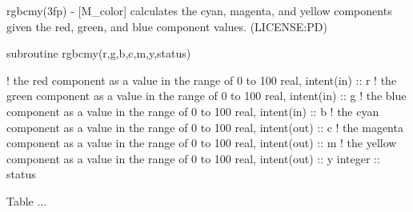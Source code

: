 \begin{DoxyDescription}
\item[\label{_RGBCMY}%
N\+A\+ME ]rgbcmy(3fp) -\/ \mbox{[}M\+\_\+color\mbox{]} calculates the cyan, magenta, and yellow components given the red, green, and blue component values. (L\+I\+C\+E\+N\+SE\+:PD) 


\item[S\+Y\+N\+O\+P\+S\+IS ]
\begin{DoxyPre}
    subroutine rgbcmy(r,g,b,c,m,y,status)\end{DoxyPre}



\begin{DoxyPre}     ! the red component as a value in the range of 0 to 100
     real, intent(in)  :: r
     ! the green component as a value in the range of 0 to 100
     real, intent(in)  :: g
     ! the blue component as a value in the range of 0 to 100
     real, intent(in)  :: b
     ! the cyan component as a value in the range of 0 to 100
     real, intent(out) :: c
     ! the magenta component as a value in the range of 0 to 100
     real, intent(out) :: m
     ! the yellow component as a value in the range of 0 to 100
     real, intent(out) :: y
     integer           :: status
    \end{DoxyPre}
 


\item[D\+E\+S\+C\+R\+I\+P\+T\+I\+ON ]Table ... ~\newline
~\newline


\begin{quote}
\tabulinesep=1mm
\end{quote}
\end{DoxyDescription}
